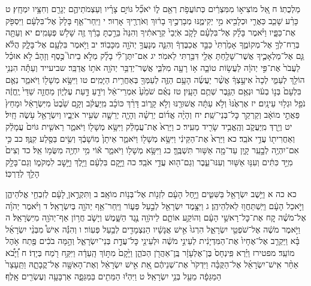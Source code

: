 \documentclass[twoside, openany, parskip=half, 11pt]{book}
\begin{document}
מַלְכֻתֽוֹ׃ ח אֵ֚ל מוֹצִיא֣וֹ מִמִּצְרַ֔יִם כְּתוֹעֲפֹ֥ת רְאֵ֖ם ל֑וֹ יֹאכַ֞ל גּוֹיִ֣ם צָרָ֗יו וְעַצְמֹתֵיהֶ֛ם יְגָרֵ֖ם וְחִצָּ֥יו יִמְחָֽץ׃ ט כָּרַ֨ע שָׁכַ֧ב כַּאֲרִ֛י וּכְלָבִ֖יא מִ֣י יְקִימֶ֑נּוּ מְבָרְכֶ֣יךָ בָר֔וּךְ וְאֹרְרֶ֖יךָ אָרֽוּר׃ י וַיִּֽחַר־אַ֤ף בָּלָק֙ אֶל־בִּלְעָ֔ם וַיִּסְפֹּ֖ק אֶת־כַּפָּ֑יו וַיֹּ֨אמֶר בָּלָ֜ק אֶל־בִּלְעָ֗ם לָקֹ֤ב אֹֽיְבַי֙ קְרָאתִ֔יךָ וְהִנֵּה֙ בֵּרַ֣כְתָּ בָרֵ֔ךְ זֶ֖ה שָׁלֹ֥שׁ פְּעָמִֽים׃ יא וְעַתָּ֖ה בְּרַח־לְךָ֣ אֶל־מְקוֹמֶ֑ךָ אָמַ֙רְתִּי֙ כַּבֵּ֣ד אֲכַבֶּדְךָ֔ וְהִנֵּ֛ה מְנָעֲךָ֥ יְהֹוָ֖ה מִכָּבֽוֹד׃ יב וַיֹּ֥אמֶר בִּלְעָ֖ם אֶל־בָּלָ֑ק הֲלֹ֗א גַּ֧ם אֶל־מַלְאָכֶ֛יךָ אֲשֶׁר־שָׁלַ֥חְתָּ אֵלַ֖י דִּבַּ֥רְתִּי לֵאמֹֽר׃ יג אִם־יִתֶּן־לִ֨י בָלָ֜ק מְלֹ֣א בֵיתוֹ֮ כֶּ֣סֶף וְזָהָב֒ לֹ֣א אוּכַ֗ל לַעֲבֹר֙ אֶת־פִּ֣י יְהֹוָ֔ה לַעֲשׂ֥וֹת טוֹבָ֛ה א֥וֹ רָעָ֖ה מִלִּבִּ֑י אֲשֶׁר־יְדַבֵּ֥ר יְהֹוָ֖ה אֹת֥וֹ אֲדַבֵּֽר׃ שביעייד וְעַתָּ֕ה הִנְנִ֥י הוֹלֵ֖ךְ לְעַמִּ֑י לְכָה֙ אִיעָ֣צְךָ֔ אֲשֶׁ֨ר יַעֲשֶׂ֜ה הָעָ֥ם הַזֶּ֛ה לְעַמְּךָ֖ בְּאַחֲרִ֥ית הַיָּמִֽים׃ טו וַיִּשָּׂ֥א מְשָׁל֖וֹ וַיֹּאמַ֑ר נְאֻ֤ם בִּלְעָם֙ בְּנ֣וֹ בְעֹ֔ר וּנְאֻ֥ם הַגֶּ֖בֶר שְׁתֻ֥ם הָעָֽיִן׃ טז נְאֻ֗ם שֹׁמֵ֙עַ֙ אִמְרֵי־אֵ֔ל וְיֹדֵ֖עַ דַּ֣עַת עֶלְי֑וֹן מַחֲזֵ֤ה שַׁדַּי֙ יֶֽחֱזֶ֔ה נֹפֵ֖ל וּגְל֥וּי עֵינָֽיִם׃ יז אֶרְאֶ֙נּוּ֙ וְלֹ֣א עַתָּ֔ה אֲשׁוּרֶ֖נּוּ וְלֹ֣א קָר֑וֹב דָּרַ֨ךְ כּוֹכָ֜ב מִֽיַּעֲקֹ֗ב וְקָ֥ם שֵׁ֙בֶט֙ מִיִּשְׂרָאֵ֔ל וּמָחַץ֙ פַּאֲתֵ֣י מוֹאָ֔ב וְקַרְקַ֖ר כׇּל־בְּנֵי־שֵֽׁת׃ יח וְהָיָ֨ה אֱד֜וֹם יְרֵשָׁ֗ה וְהָיָ֧ה יְרֵשָׁ֛ה שֵׂעִ֖יר אֹיְבָ֑יו וְיִשְׂרָאֵ֖ל עֹ֥שֶׂה חָֽיִל׃ יט וְיֵ֖רְדְּ מִֽיַּעֲקֹ֑ב וְהֶֽאֱבִ֥יד שָׂרִ֖יד מֵעִֽיר׃ כ וַיַּרְא֙ אֶת־עֲמָלֵ֔ק וַיִּשָּׂ֥א מְשָׁל֖וֹ וַיֹּאמַ֑ר רֵאשִׁ֤ית גּוֹיִם֙ עֲמָלֵ֔ק וְאַחֲרִית֖וֹ עֲדֵ֥י אֹבֵֽד׃ כא וַיַּרְא֙ אֶת־הַקֵּינִ֔י וַיִּשָּׂ֥א מְשָׁל֖וֹ וַיֹּאמַ֑ר אֵיתָן֙ מֽוֹשָׁבֶ֔ךָ וְשִׂ֥ים בַּסֶּ֖לַע קִנֶּֽךָ׃ כב כִּ֥י אִם־יִהְיֶ֖ה לְבָ֣עֵֽר קָ֑יִן עַד־מָ֖ה אַשּׁ֥וּר תִּשְׁבֶּֽךָּ׃ כג וַיִּשָּׂ֥א מְשָׁל֖וֹ וַיֹּאמַ֑ר א֕וֹי מִ֥י יִחְיֶ֖ה מִשֻּׂמ֥וֹ אֵֽל׃ כד וְצִים֙ מִיַּ֣ד כִּתִּ֔ים וְעִנּ֥וּ אַשּׁ֖וּר וְעִנּוּ־עֵ֑בֶר וְגַם־ה֖וּא עֲדֵ֥י אֹבֵֽד׃ כה וַיָּ֣קׇם בִּלְעָ֔ם וַיֵּ֖לֶךְ וַיָּ֣שׇׁב לִמְקֹמ֑וֹ וְגַם־בָּלָ֖ק הָלַ֥ךְ לְדַרְכּֽוֹ׃

כא כה א וַיֵּ֥שֶׁב יִשְׂרָאֵ֖ל בַּשִּׁטִּ֑ים וַיָּ֣חֶל הָעָ֔ם לִזְנ֖וֹת אֶל־בְּנ֥וֹת מוֹאָֽב׃ ב וַתִּקְרֶ֣אןָ לָעָ֔ם לְזִבְחֵ֖י אֱלֹהֵיהֶ֑ן וַיֹּ֣אכַל הָעָ֔ם וַיִּֽשְׁתַּחֲו֖וּ לֵאלֹֽהֵיהֶֽן׃ ג וַיִּצָּ֥מֶד יִשְׂרָאֵ֖ל לְבַ֣עַל פְּע֑וֹר וַיִּֽחַר־אַ֥ף יְהֹוָ֖ה בְּיִשְׂרָאֵֽל׃ ד וַיֹּ֨אמֶר יְהֹוָ֜ה אֶל־מֹשֶׁ֗ה קַ֚ח אֶת־כׇּל־רָאשֵׁ֣י הָעָ֔ם וְהוֹקַ֥ע אוֹתָ֛ם לַיהֹוָ֖ה נֶ֣גֶד הַשָּׁ֑מֶשׁ וְיָשֹׁ֛ב חֲר֥וֹן אַף־יְהֹוָ֖ה מִיִּשְׂרָאֵֽל׃ ה וַיֹּ֣אמֶר מֹשֶׁ֔ה אֶל־שֹׁפְטֵ֖י יִשְׂרָאֵ֑ל הִרְגוּ֙ אִ֣ישׁ אֲנָשָׁ֔יו הַנִּצְמָדִ֖ים לְבַ֥עַל פְּעֽוֹר׃ ו וְהִנֵּ֡ה אִישׁ֩ מִבְּנֵ֨י יִשְׂרָאֵ֜ל בָּ֗א וַיַּקְרֵ֤ב אֶל־אֶחָיו֙ אֶת־הַמִּדְיָנִ֔ית לְעֵינֵ֣י מֹשֶׁ֔ה וּלְעֵינֵ֖י כׇּל־עֲדַ֣ת בְּנֵי־יִשְׂרָאֵ֑ל וְהֵ֣מָּה בֹכִ֔ים פֶּ֖תַח אֹ֥הֶל מוֹעֵֽד׃ מפטירז וַיַּ֗רְא פִּֽינְחָס֙ בֶּן־אֶלְעָזָ֔ר בֶּֽן־אַהֲרֹ֖ן הַכֹּהֵ֑ן וַיָּ֙קׇם֙ מִתּ֣וֹךְ הָֽעֵדָ֔ה וַיִּקַּ֥ח רֹ֖מַח בְּיָדֽוֹ׃ ח וַ֠יָּבֹ֠א אַחַ֨ר אִֽישׁ־יִשְׂרָאֵ֜ל אֶל־הַקֻּבָּ֗ה וַיִּדְקֹר֙ אֶת־שְׁנֵיהֶ֔ם אֵ֚ת אִ֣ישׁ יִשְׂרָאֵ֔ל וְאֶת־הָאִשָּׁ֖ה אֶל־קֳבָתָ֑הּ וַתֵּֽעָצַר֙ הַמַּגֵּפָ֔ה מֵעַ֖ל בְּנֵ֥י יִשְׂרָאֵֽל׃ ט וַיִּהְי֕וּ הַמֵּתִ֖ים בַּמַּגֵּפָ֑ה אַרְבָּעָ֥ה וְעֶשְׂרִ֖ים אָֽלֶף׃
\end{document}
